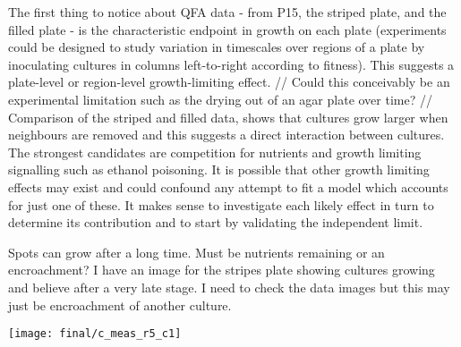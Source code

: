 The first thing to notice about QFA data - from P15, the striped
plate, and the filled plate - is the characteristic endpoint in growth
on each plate (experiments could be designed to study variation in
timescales over regions of a plate by inoculating cultures in columns
left-to-right according to fitness). This suggests a plate-level or
region-level growth-limiting effect.
//
Could this conceivably be an experimental limitation such as the
drying out of an agar plate over time?
//
Comparison of the striped and filled data, shows that cultures grow
larger when neighbours are removed and this suggests a direct
interaction between cultures. The strongest candidates are competition
for nutrients and growth limiting signalling such as ethanol
poisoning. It is possible that other growth limiting effects may exist
and could confound any attempt to fit a model which accounts for just
one of these. It makes sense to investigate each likely effect in turn
to determine its contribution and to start by validating the
independent limit.


Spots can grow after a long time. Must be nutrients remaining or an
encroachment? I have an image for the stripes plate showing cultures
growing and believe after a very late stage. I need to check the data
images but this may just be encroachment of another culture.
\graphicspath{{images/stripes/}}
\begin{Figure}
  \centering
  \texttt{[image: final/c\_meas\_r5\_c1]}
  \label{fig:kn_guessing}
\end{Figure}



